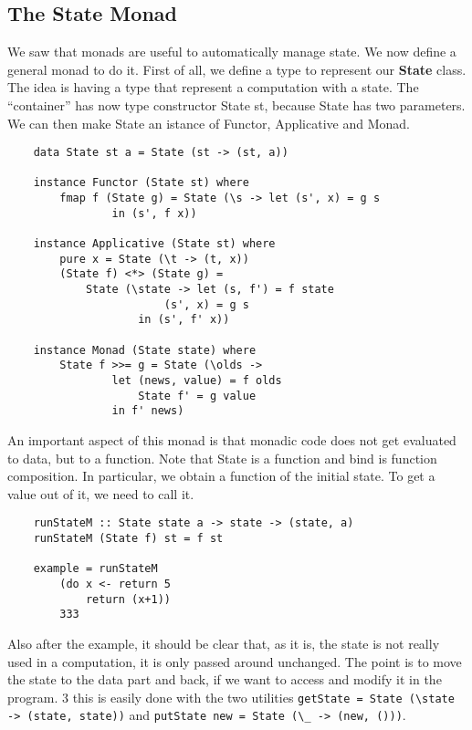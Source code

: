 \subsection{The State Monad}
We saw that monads are useful to automatically manage state.
We now define a general monad to do it.
First of all, we define a type to represent our \textbf{State} class.
The idea is having a type that represent a computation with a state.
The “container” has now type constructor State st, because State has two parameters.
We can then make State an istance of Functor, Applicative and Monad.
\begin{lstlisting}
	data State st a = State (st -> (st, a))
	
	instance Functor (State st) where
		fmap f (State g) = State (\s -> let (s', x) = g s
				in (s', f x))
	
	instance Applicative (State st) where
		pure x = State (\t -> (t, x))
		(State f) <*> (State g) =
			State (\state -> let (s, f') = f state
						(s', x) = g s
					in (s', f' x))
	
	instance Monad (State state) where
		State f >>= g = State (\olds ->
				let (news, value) = f olds
					State f' = g value
				in f' news)
\end{lstlisting}
An important aspect of this monad is that monadic code does not get evaluated to data, but to a function.
Note that State is a function and bind is function composition.
In particular, we obtain a function of the initial state.
To get a value out of it, we need to call it.
\begin{lstlisting}
	runStateM :: State state a -> state -> (state, a)
	runStateM (State f) st = f st
	
	example = runStateM
		(do x <- return 5
			return (x+1))
		333
\end{lstlisting}
Also after the example, it should be clear that, as it is, the state is not really used in a computation, it is only passed around unchanged.
The point is to move the state to the data part and back, if we want to access and modify it in the program.
3 this is easily done with the two utilities \texttt{getState = State (\textbackslash state -> (state, state))} and \texttt{putState new = State (\textbackslash \_ -> (new, ()))}.

